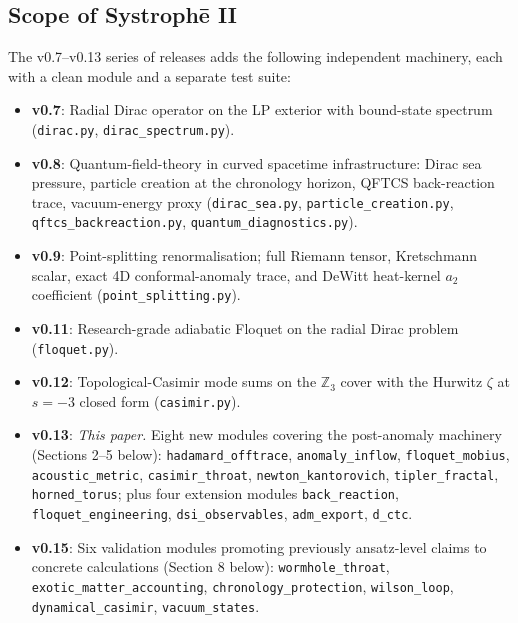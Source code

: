 \documentclass[11pt,a4paper]{article}
\begin{document}
\subsection{Scope of Systroph\=e II}

The v0.7--v0.13 series of releases adds the following independent
machinery, each with a clean module and a separate test suite:

\begin{itemize}
\item \textbf{v0.7}: Radial Dirac operator on the LP exterior with
bound-state spectrum
(\texttt{dirac.py}, \texttt{dirac\_spectrum.py}).

\item \textbf{v0.8}: Quantum-field-theory in curved spacetime
infrastructure: Dirac sea pressure, particle creation at the
chronology horizon, QFTCS back-reaction trace, vacuum-energy proxy
(\texttt{dirac\_sea.py}, \texttt{particle\_creation.py},
\texttt{qftcs\_backreaction.py}, \texttt{quantum\_diagnostics.py}).

\item \textbf{v0.9}: Point-splitting renormalisation; full Riemann
tensor, Kretschmann scalar, exact 4D conformal-anomaly trace, and
DeWitt heat-kernel $a_2$ coefficient
(\texttt{point\_splitting.py}).

\item \textbf{v0.11}: Research-grade adiabatic Floquet on the radial
Dirac problem (\texttt{floquet.py}).

\item \textbf{v0.12}: Topological-Casimir mode sums on the
$\mathbb{Z}_3$ cover with the Hurwitz $\zeta$ at $s=-3$ closed
form (\texttt{casimir.py}).

\item \textbf{v0.13}: \emph{This paper.} Eight new modules covering
the post-anomaly machinery (Sections 2--5 below):
\texttt{hadamard\_offtrace}, \texttt{anomaly\_inflow},
\texttt{floquet\_mobius}, \texttt{acoustic\_metric},
\texttt{casimir\_throat}, \texttt{newton\_kantorovich},
\texttt{tipler\_fractal}, \texttt{horned\_torus}; plus four extension
modules \texttt{back\_reaction}, \texttt{floquet\_engineering},
\texttt{dsi\_observables}, \texttt{adm\_export}, \texttt{d\_ctc}.

\item \textbf{v0.15}: Six validation modules promoting previously
ansatz-level claims to concrete calculations (Section 8 below):
\texttt{wormhole\_throat}, \texttt{exotic\_matter\_accounting},
\texttt{chronology\_protection}, \texttt{wilson\_loop},
\texttt{dynamical\_casimir}, \texttt{vacuum\_states}.
\end{itemize}
\end{document}

